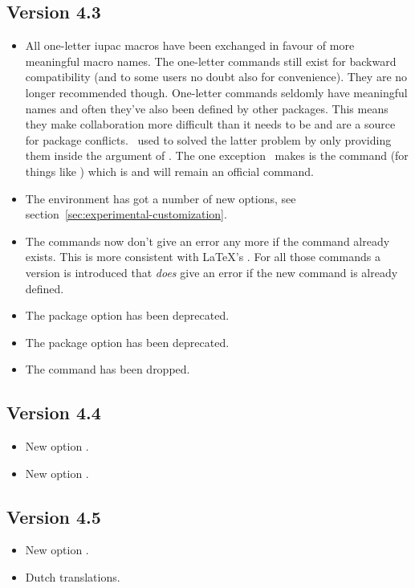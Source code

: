 \documentclass[load-preamble+]{cnltx-doc}
\begin{document}
\subsection{Version 4.3}
\begin{itemize}
  \item All one-letter \acs{iupac} macros have been exchanged in favour of
    more meaningful macro names.  The one-letter commands still exist for
    backward compatibility (and to some users no doubt also for convenience).
    They are no longer recommended though.  One-letter commands seldomly have
    meaningful names and  often they've also been defined by other packages.
    This means they make collaboration more difficult than it needs to be and
    are a source for package conflicts.  \chemmacros\ used to solved the
    latter problem by only providing them inside the argument of
    \label{desc:one-letter-commands}.  The one exception
    \chemmacros\ makes is the command  (for things like \pH) which is
    and will remain an official command.
  \item The environment  has got a number of new options,
    see section~\ref{sec:experimental-customization}.
  \item The commands  now don't give an error any
    more if the command already exists.  This is more consistent with \LaTeX's
    .  For all those commands a version
     is introduced that \emph{does} give an error if
    the new command is already defined.
  \item The package option  has been deprecated.
  \item The package option  has been deprecated.
  \item The command  has been dropped.
\end{itemize}

\subsection{Version 4.4}
\begin{itemize}
  \item New  option .
  \item New  option .
\end{itemize}

\subsection{Version 4.5}
\begin{itemize}
  \item New  option .
  \item Dutch translations.
\end{itemize}
\end{document}
